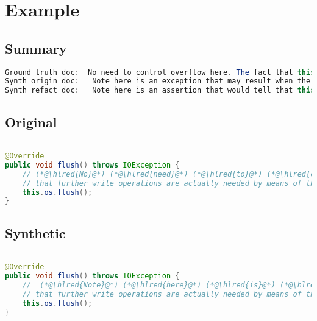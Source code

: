 \documentclass[11pt]{article}
\DeclareRobustCommand{\hlred}[1]{{\sethlcolor{YellowOrange}\hl{#1}}}
\begin{document}
  \pagebreak
  \section{Example}
  \subsection{Summary}

  \begin{lstlisting}[language=java]
Ground truth doc:  No need to control overflow here. The fact that this has overflow will be used as a flag to determine
Synth origin doc:   Note here is an exception that may result when the implementation checks whether and if the operation succeeds to
Synth refact doc:   Note here is an assertion that would tell that this writer knows now as is in case we detect
  \end{lstlisting}

  \subsection{Original}
  \begin{lstlisting}[language=java]

@Override
public void flush() throws IOException {
    // (*@\hlred{No}@*) (*@\hlred{need}@*) (*@\hlred{to}@*) (*@\hlred{control}@*) (*@\hlred{overflow}@*) (*@\hlred{here.}@*) (*@\hlred{The}@*) (*@\hlred{fact}@*) (*@\hlred{that}@*) (*@\hlred{this}@*) (*@\hlred{has}@*) (*@\hlred{overflow}@*) (*@\hlred{will}@*) (*@\hlred{be}@*) (*@\hlred{used}@*) (*@\hlred{as}@*) (*@\hlred{a}@*) (*@\hlred{flag}@*) to(*@\hlred{ determine}@*)
    // that further write operations are actually needed by means of the isOverflown() method.
    this.os.flush();
}
  \end{lstlisting}
  \subsection{Synthetic}

  \begin{lstlisting}[language=java]

@Override
public void flush() throws IOException {
    //  (*@\hlred{Note}@*) (*@\hlred{here}@*) (*@\hlred{is}@*) (*@\hlred{an}@*) (*@\hlred{exception}@*) (*@\hlred{that}@*) (*@\hlred{may}@*) (*@\hlred{result}@*) (*@\hlred{when}@*) (*@\hlred{the}@*) (*@\hlred{implementation}@*) (*@\hlred{checks}@*) (*@\hlred{whether}@*) (*@\hlred{and}@*) (*@\hlred{if}@*) (*@\hlred{the}@*) (*@\hlred{operation}@*) (*@\hlred{succeeds}@*) to
    // that further write operations are actually needed by means of the isOverflown() method.
    this.os.flush();
}
  \end{lstlisting}
\end{document}
